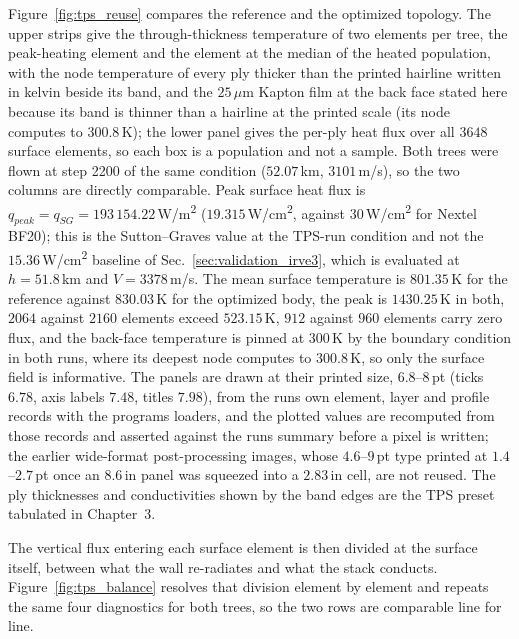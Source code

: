 Figure~\ref{fig:tps_reuse} compares the reference and the optimized topology. The upper strips give the through-thickness temperature of two elements per tree, the peak-heating element and the element at the median of the heated population, with the node temperature of every ply thicker than the printed hairline written in kelvin beside its band, and the $25$\,$\mu$m Kapton film at the back face stated here because its band is thinner than a hairline at the printed scale (its node computes to $300.8$\,K); the lower panel gives the per-ply heat flux over all $3648$ surface elements, so each box is a population and not a sample. Both trees were flown at step 2200 of the same condition ($52.07$\,km, $3101$\,m/s), so the two columns are directly comparable. Peak surface heat flux is $q_{peak} = q_{SG} = 193\,154.22$\,W/m\textsuperscript{2} ($19.315$\,W/cm\textsuperscript{2}, against $30$\,W/cm\textsuperscript{2} for Nextel BF20); this is the Sutton--Graves value at the TPS-run condition and not the $15.36$\,W/cm\textsuperscript{2} baseline of Sec.~\ref{sec:validation_irve3}, which is evaluated at $h = 51.8$\,km and $V = 3378$\,m/s. The mean surface temperature is $801.35$\,K for the reference against $830.03$\,K for the optimized body, the peak is $1430.25$\,K in both, $2064$ against $2160$ elements exceed $523.15$\,K, $912$ against $960$ elements carry zero flux, and the back-face temperature is pinned at $300$\,K by the boundary condition in both runs, where its deepest node computes to $300.8$\,K, so only the surface field is informative. The panels are drawn at their printed size, $6.8$--$8$\,pt (ticks $6.78$, axis labels $7.48$, titles $7.98$), from the run\textquotesingle s own element, layer and profile records with the program\textquotesingle s loaders, and the plotted values are recomputed from those records and asserted against the run\textquotesingle s summary before a pixel is written; the earlier wide-format post-processing images, whose $4.6$--$9$\,pt type printed at $1.4$--$2.7$\,pt once an $8.6$\,in panel was squeezed into a $2.83$\,in cell, are not reused. The ply thicknesses and conductivities shown by the band edges are the TPS preset tabulated in Chapter~3.

The vertical flux entering each surface element is then divided at the
surface itself, between what the wall re-radiates and what the stack conducts.
Figure~\ref{fig:tps_balance} resolves that division element by element and
repeats the same four diagnostics for both trees, so the two rows are
comparable line for line.

